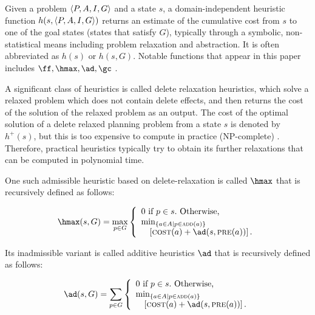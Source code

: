 
Given a problem ${\left<P,A,I,G\right>}$ and a state $s$,
a domain-independent heuristic function $h(s, {\left<P,A,I,G\right>})$
returns an estimate of the cumulative cost from $s$ to one of the goal states (states that satisfy $G$),
typically through a symbolic, non-statistical means including problem relaxation and abstraction.
It is often abbreviated as $h(s)$ or $h(s,G)$.
Notable \lsota functions that appear in this paper includes
$\ff, \hmax, \ad, \gc$ \cite{hoffmann01,bonet2001planning,FikesHN72}.

A significant class of heuristics is called delete relaxation heuristics,
which solve a relaxed problem which does not contain delete effects,
and then returns the cost of the solution of the relaxed problem as an output.
The cost of the optimal solution of a delete relaxed planning problem from a state $s$ is
denoted by $h^+(s)$, but this is too expensive to compute in practice (NP-complete) \cite{bylander1996}.
Therefore, practical heuristics typically try to obtain its further relaxations
that can be computed in polynomial time.

One such admissible heuristic based on delete-relaxation is called
$\hmax$ \cite{bonet2001planning} that is recursively defined as follows:

\begin{align}
 \hmax(s,G) = \max_{p\in G}
 \left\{
  \begin{array}{l}
   0\ \text{if}\ p\in s.\ \text{Otherwise,}\\
   \min_{\braces{a\in A\mid p\in\adde(a)}} \\
    \quad \left[\cost(a)+\ad(s, \pre(a))\right].
  \end{array}
 \right.
\end{align}

Its inadmissible variant is called
additive heuristics $\ad$ \cite{bonet2001planning} that is recursively defined as follows:

\begin{align}
 \ad(s,G) = \sum_{p\in G}
 \left\{
  \begin{array}{l}
   0\ \text{if}\ p\in s.\ \text{Otherwise,}\\
   \min_{\braces{a\in A\mid p\in\adde(a)}} \\
    \quad \left[\cost(a)+\ad(s, \pre(a))\right].
  \end{array}
 \right.
\end{align}

